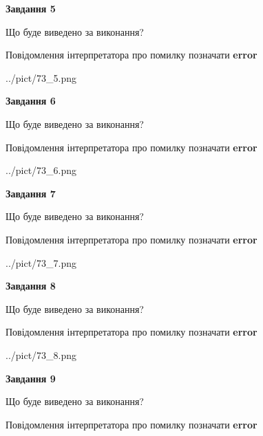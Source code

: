 \documentclass[11pt, ukrainian]{article}
\begin{document}
{\begin {large}
{\begin {center}\textbf{Завдання 5}\end {center}}\par
Що буде виведено за виконання? \par
Повідомлення інтерпретатора про помилку позначати \textbf{error}

\begin{center}
	{../pict/73_5.png}
\end{center}
\newpage

{\begin {center}\textbf{Завдання 6}\end {center}}\par
Що буде виведено за виконання? \par
Повідомлення інтерпретатора про помилку позначати \textbf{error}

\begin{center}
	{../pict/73_6.png}
\end{center}
\newpage

{\begin {center}\textbf{Завдання 7}\end {center}}\par
Що буде виведено за виконання? \par
Повідомлення інтерпретатора про помилку позначати \textbf{error}

\begin{center}
	{../pict/73_7.png}
\end{center}
\newpage

{\begin {center}\textbf{Завдання 8}\end {center}}\par
Що буде виведено за виконання? \par
Повідомлення інтерпретатора про помилку позначати \textbf{error}

\begin{center}
	{../pict/73_8.png}
\end{center}
\newpage

{\begin {center}\textbf{Завдання 9}\end {center}}\par
Що буде виведено за виконання? \par
Повідомлення інтерпретатора про помилку позначати \textbf{error}


\end{large}}
\end{document}

